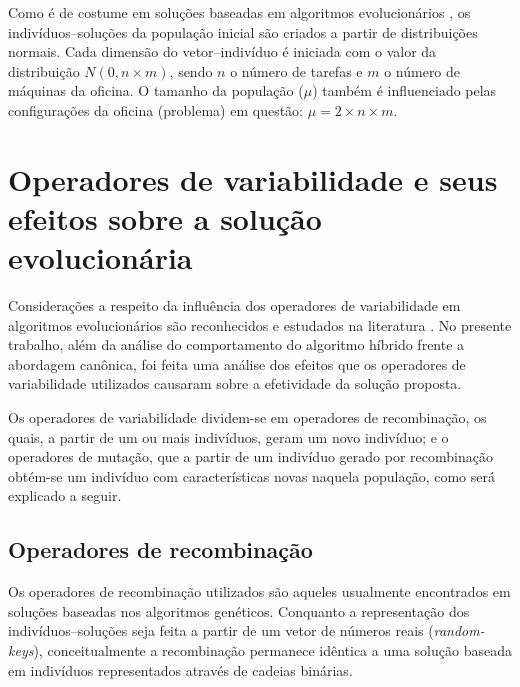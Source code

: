 \documentclass[relatorio,nocolorlinks]{inf-ufg}
\begin{document}
Como \'{e} de costume em solu\c{c}\~{o}es baseadas em algoritmos evolucion\'{a}rios \cite{DeJong2006} \cite{Goncalves2002}, os
indiv\'{i}duos--solu\c{c}\~{o}es da popula\c{c}\~{a}o inicial s\~{a}o criados a partir de distribui\c{c}\~{o}es normais. Cada dimens\~{a}o do
vetor--indiv\'{i}duo \'{e} iniciada com o valor da distribui\c{c}\~{a}o $N(0, n \times m)$, sendo $n$ o n\'{u}mero de tarefas e $m$ o n\'{u}mero
de m\'{a}quinas da oficina. O tamanho da popula\c{c}\~{a}o ($\mu$) tamb\'{e}m \'{e} influenciado pelas configura\c{c}\~{o}es da oficina (problema)
em quest\~{a}o: $\mu = 2 \times n \times m$.

\section{Operadores de variabilidade e seus efeitos sobre a solu\c{c}\~{a}o evolucion\'{a}ria}

Considera\c{c}\~{o}es a respeito da influ\^{e}ncia dos operadores de variabilidade em algoritmos evolucion\'{a}rios s\~{a}o reconhecidos e estudados
na literatura \cite{DeJong2006} \cite{Miller1995}. No presente trabalho, al\'{e}m da an\'{a}lise do comportamento do algoritmo h\'{i}brido frente
a abordagem can\^{o}nica, foi feita uma an\'{a}lise dos efeitos que os operadores de variabilidade utilizados causaram sobre a efetividade da
solu\c{c}\~{a}o proposta.

Os operadores de variabilidade dividem-se em operadores de recombina\c{c}\~{a}o, os quais, a partir de um ou mais indiv\'{i}duos, geram um novo
indiv\'{i}duo; e o operadores de muta\c{c}\~{a}o, que a partir de um indiv\'{i}duo gerado por recombina\c{c}\~{a}o obt\'{e}m-se um indiv\'{i}duo
com caracter\'{i}sticas novas naquela popula\c{c}\~{a}o, como ser\'{a} explicado a seguir.

\subsection{Operadores de recombina\c{c}\~{a}o}
Os operadores de recombina\c{c}\~{a}o utilizados s\~{a}o aqueles usualmente encontrados em solu\c{c}\~{o}es baseadas nos algoritmos gen\'{e}ticos.
Conquanto a representa\c{c}\~{a}o dos indiv\'{i}duos--solu\c{c}\~{o}es seja feita a partir de um vetor de n\'{u}meros reais (\textit{random-keys}),
conceitualmente a recombina\c{c}\~{a}o permanece id\^{e}ntica a uma solu\c{c}\~{a}o baseada em indiv\'{i}duos representados atrav\'{e}s de cadeias
bin\'{a}rias.
\end{document}
